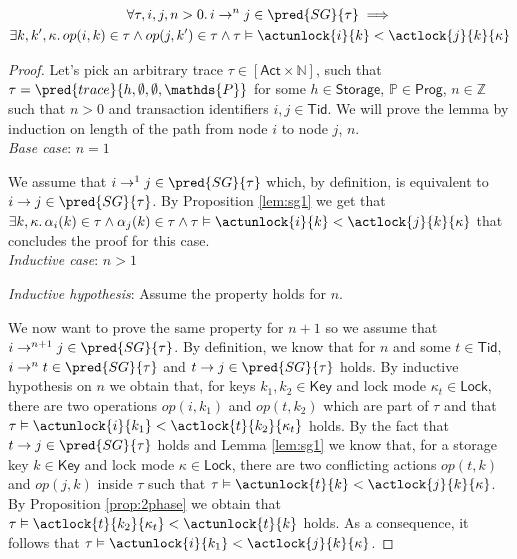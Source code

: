 \lem \label{lem:sg2}
\begin{gather*}
\forall \tau, i, j, n > 0 \ldotp i \rightarrow^n j \in \pred{SG}{\tau} \implies \\
\exists k, k', \kappa \ldotp op(i, k) \in \tau \land op(j, k') \in \tau \land \tau \vDash \actunlock{i}{k} < \actlock{j}{k}{\kappa}
\end{gather*}

{\parindent0pt
\begin{proof}
Let's pick an arbitrary trace $\tau \in [\mathsf{Act} \times \mathds{N}]$, such that $\tau = \pred{trace}{h, \emptyset, \emptyset, \mathds{P}}$ for some $h \in \mathsf{Storage}$, $\mathds{P} \in \mathsf{Prog}$, $n \in \mathds{Z}$ such that $n > 0$ and transaction identifiers $i, j \in \mathsf{Tid}$. We will prove the lemma by induction on length of the path from node $i$ to node $j$, $n$. \\

\textit{Base case}: $n = 1$

We assume that $i \rightarrow^1 j \in \pred{SG}{\tau}$ which, by definition, is equivalent to $i \rightarrow j \in \pred{SG}{\tau}$. By Proposition \ref{lem:sg1} we get that $\exists k, \kappa \ldotp \alpha_i(k) \in \tau \land \alpha_j(k) \in \tau \land \tau \vDash \actunlock{i}{k} < \actlock{j}{k}{\kappa}$ that concludes the proof for this case. \\

\textit{Inductive case}: $n > 1$

\textit{Inductive hypothesis}: Assume the property holds for $n$.

We now want to prove the same property for $n + 1$ so we assume that $i \rightarrow^{n+1} j \in \pred{SG}{\tau}$. By definition, we know that for $n$ and some $t \in \mathsf{Tid}$, $i \rightarrow^n t \in \pred{SG}{\tau}$ and $t \rightarrow j \in \pred{SG}{\tau}$ holds. By inductive hypothesis on $n$ we obtain that, for keys $k_1, k_2 \in \mathsf{Key}$ and lock mode $\kappa_t \in \mathsf{Lock}$, there are two operations $op(i, k_1)$ and $op(t, k_2)$ which are part of $\tau$ and that $\tau \vDash \actunlock{i}{k_1} < \actlock{t}{k_2}{\kappa_t}$ holds. By the fact that $t \rightarrow j \in \pred{SG}{\tau}$ holds and Lemma \ref{lem:sg1} we know that, for a storage key $k \in \mathsf{Key}$ and lock mode $\kappa \in \mathsf{Lock}$, there are two conflicting actions $op(t, k)$ and $op(j, k)$ inside $\tau$ such that $\tau \vDash \actunlock{t}{k} < \actlock{j}{k}{\kappa}$. By Proposition \ref{prop:2phase} we obtain that $\tau \vDash \actlock{t}{k_2}{\kappa_t} < \actunlock{t}{k}$ holds. As a consequence, it follows that $\tau \vDash \actunlock{i}{k_1} < \actlock{j}{k}{\kappa}$.
\end{proof}
}

